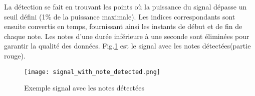 La détection se fait en trouvant les points où la puissance du signal dépasse un seuil défini (1\% de la puissance maximale). Les indices correspondants sont ensuite convertis en temps, fournissant ainsi les instants de début et de fin de chaque note. Les notes d'une durée inférieure à une seconde sont éliminées pour garantir la qualité des données. 
Fig.\ref{fig:Note_Detection} est le signal avec les notes détectées(partie rouge).
\newpage
\begin{figure}[htb]
    \centering
    \texttt{[image: signal\_with\_note\_detected.png]}
    \caption{Exemple signal avec les notes détectées}
    \label{fig:Note_Detection}
\end{figure}